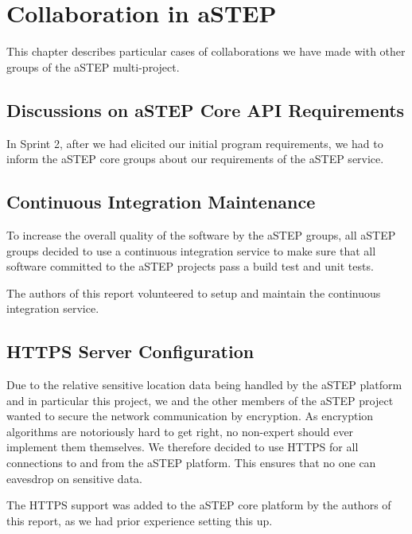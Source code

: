 \chapter{Collaboration in aSTEP}

This chapter describes particular cases of collaborations we have made with other groups of the aSTEP multi-project.

\section{Discussions on aSTEP Core API Requirements}
In Sprint 2, after we had elicited our initial program requirements, we had to inform the aSTEP core groups about our requirements of the aSTEP service.

\section{Continuous Integration Maintenance}
To increase the overall quality of the software by the aSTEP groups, all aSTEP groups decided to use a continuous integration service to make sure that all software committed to the aSTEP projects pass a build test and unit tests.

The authors of this report volunteered to setup and maintain the continuous integration service.

\section{HTTPS Server Configuration}
Due to the relative sensitive location data being handled by the aSTEP platform and in particular this project, we and the other members of the aSTEP project wanted to secure the network communication by encryption. As encryption algorithms are notoriously hard to get right, no non-expert should ever implement them themselves. We therefore decided to use HTTPS for all connections to and from the aSTEP platform. This ensures that no one can eavesdrop on sensitive data.

The HTTPS support was added to the aSTEP core platform by the authors of this report, as we had prior experience setting this up.